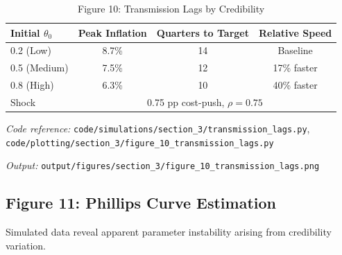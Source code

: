 \documentclass[11pt]{article}
\begin{document}
\begin{table}[htbp]
\centering
\caption{Figure 10: Transmission Lags by Credibility}
\label{tab:transmission_lags}
\begin{threeparttable}
\begin{tabular}{lccc}
\toprule
Initial $\theta_0$ & Peak Inflation & Quarters to Target & Relative Speed \\
\midrule
0.2 (Low) & 8.7\% & 14 & Baseline \\
0.5 (Medium) & 7.5\% & 12 & 17\% faster \\
0.8 (High) & 6.3\% & 10 & 40\% faster \\
\midrule
Shock & \multicolumn{3}{c}{0.75 pp cost-push, $\rho = 0.75$} \\
\bottomrule
\end{tabular}
\begin{tablenotes}
\small
\item \textit{Code reference:} \texttt{code/simulations/section\_3/transmission\_lags.py}, \texttt{code/plotting/section\_3/figure\_10\_transmission\_lags.py}
\item \textit{Output:} \texttt{output/figures/section\_3/figure\_10\_transmission\_lags.png}
\end{tablenotes}
\end{threeparttable}
\end{table}

\subsection{Figure 11: Phillips Curve Estimation}

Simulated data reveal apparent parameter instability arising from credibility variation.
\end{document}

